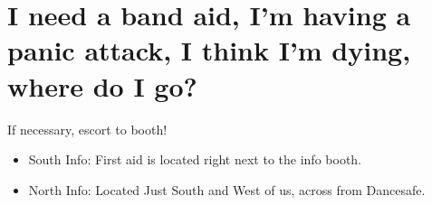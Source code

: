 \section{I need a band aid, I'm having a panic attack, I think I'm dying, where do I go?}
If necessary, escort to booth!
\begin{itemize}
	\item South Info: First aid is located right next to the info booth. 
	\item North Info: Located Just South and West of us, across from Dancesafe.
\end{itemize}











